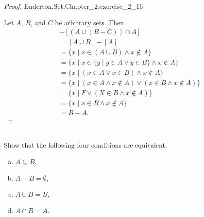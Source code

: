 \documentclass{report}
\begin{document}
\begin{proof}

    {Enderton.Set.Chapter\_2.exercise\_2\_16}

  Let $A$, $B$, and $C$ be arbitrary sets.
  Then
    \begin{align*}
      [(A \cup B \cup C) \cap (A \cup B)] & - [(A \cup (B - C)) \cap A] \\
        & = [A \cup B] - [A] \\
        & = \{ x \mid x \in (A \cup B) \land x \not\in A \} \\
        & = \{ x \mid x \in \{ y \mid y \in A \lor y \in B \} \land x \not\in A \} \\
        & = \{ x \mid (x \in A \lor x \in B) \land x \not\in A \} \\\
        & = \{ x \mid (x \in A \land x \not\in A) \lor (x \in B \land x \not\in A) \} \\
        & = \{ x \mid F \lor (X \in B \land x \not\in A) \} \\
        & = \{ x \mid x \in B \land x \not\in A \} \\
        & = B - A.
    \end{align*}

\end{proof}

\subsection{}%

Show that the following four conditions are equivalent.

\begin{enumerate}[(a)]
  \item $A \subseteq B$,
  \item $A - B = \emptyset$,
  \item $A \cup B = B$,
  \item $A \cap B = A$.
\end{enumerate}
\end{document}
